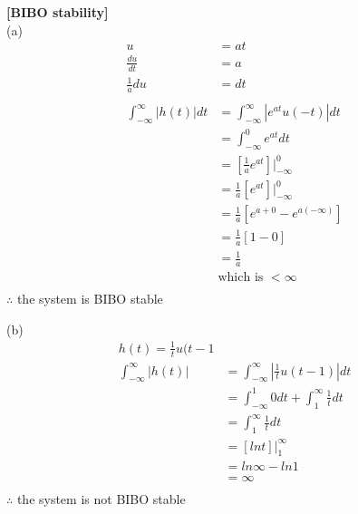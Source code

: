 \documentclass{article}
\begin{document}
 {\bf [BIBO stability]}\\
(a)\\
\begin{equation*}
\begin{split}
    u &= at\\
    \frac{du}{dt} &= a\\
    \frac{1}{a}du &= dt\\\\
     \int_{-\infty}^{\infty} |h(t)|dt &= \int_{-\infty}^{\infty} |e^{at}u(-t)|dt\\
     &= \int_{-\infty}^{0} e^{at}dt\\
     &= [\frac{1}{a}e^{at}]\big|_{-\infty}^0\\
     &= \frac{1}{a}[e^{at}]\big|_{-\infty}^0\\
     &= \frac{1}{a}[e^{a+0} - e^{a(-\infty)}]\\
     &= \frac{1}{a}[1 - 0]\\
     &= \frac{1}{a}\\
     & \text{which is $< \infty$}\\
\end{split}
\end{equation*}
$\therefore$ the system is BIBO stable

\smallskip
(b)\\
\begin{equation*}
\begin{split}
    h(t) = \frac{1}{t}u(t - 1\\
    \int_{-\infty}^{\infty}|h(t)| &= \int_{-\infty}^{\infty}|\frac{1}{t}u(t - 1)|dt\\
    &= \int_{-\infty}^{1}0dt + \int_{1}^{\infty}\frac{1}{t}dt\\
    &= \int_{1}^{\infty} \frac{1}{t}dt\\
    &= [lnt]\big|_1^{\infty}\\
    &= ln \infty - ln1\\
    &= \infty\\
\end{split}
\end{equation*}
$\therefore$ the system is not BIBO stable
\end{document}
